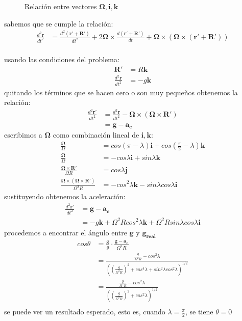 \documentclass{article}
\begin{document}
\begin{tcolorbox}
\begin{figure}[H]
        \caption{Relación entre vectores $\bm{\Omega, i, k}$}
        \label{fig:my_label}
    \end{figure}
    sabemos que se cumple la relación:
    \begin{align*}
        \frac{d^2\bm{r}}{dt^2}  
        &=\frac{d^2(\bm{r' + R'})}{dt^2}
        + 2\bm{\Omega} \times \frac{d(\bm{r' + R'})}{dt}
        + \bm{\Omega} \times (\bm{\Omega} \times (\bm{r' + R'})) \\
    \end{align*}
    \end{tcolorbox}
\begin{tcolorbox}
    usando las condiciones del problema:
    \begin{align*}
        \bm{R'} &= R\bm{k} \\
        \frac{d^2\bm{r}}{dt^2} &= -g\bm{k}
    \end{align*}
    quitando los términos que se hacen cero o son muy pequeños obtenemos la relación:
    \begin{align*}
        \frac{d^2\bm{r'}}{dt^2}
        &= \frac{d^2\bm{r}}{dt^2} - \bm{\Omega} \times (\bm{\Omega} \times \bm{R'}) \\
        &= \bm{g} - \bm{a_c}
    \end{align*} 
    escribimos a $\bm{\Omega}$ como combinación lineal de $\bm{i,k}$:
    \begin{align*}
        \frac{\bm{\Omega}}{\Omega} 
        &= cos(\pi - \lambda)\bm{i} + cos\left(\frac{\pi}{2} - \lambda \right) \bm{k} \\
        \frac{\bm{\Omega}}{\Omega} 
        &= -cos\lambda \bm{i} + sin\lambda \bm{k} \\
        \frac{\bm{\Omega} \times \bm{R'}}{\Omega R}
        &= cos\lambda \bm{j} \\
        \frac{\bm{\Omega} \times (\bm{\Omega} \times \bm{R'})}{\Omega^2 R}
        &= -cos^2\lambda \bm{k} - sin\lambda cos\lambda \bm{i} 
    \end{align*}
    sustituyendo obtenemos la aceleración:
    \begin{align*}
        \frac{d^2\bm{r'}}{dt^2} 
        &= \bm{g} - \bm{a_c} \\ 
        &= -g\bm{k} + \Omega^2R cos^2\lambda \bm{k} + \Omega^2 R sin\lambda cos\lambda \bm{i}
    \end{align*}
    procedemos a encontrar el ángulo entre $\bm{g}$ y $\bm{g_{real}}$
    \begin{align*}
        cos\theta
        &=\frac{\bm{g}}{g} \cdot \frac{\bm{g-a_c}}{\Omega^2 R} \\
        &=\frac
        {\frac{g}{\Omega^2 R} - cos^2\lambda}
        {((\frac{g}{\Omega^2 R})^2 + cos^4\lambda + sin^2\lambda cos^2\lambda)^{1/2}} \\
        &=\frac
        {\frac{g}{\Omega^2 R} - cos^2\lambda}
        {((\frac{g}{\Omega^2 R})^2 + cos^2\lambda)^{1/2}} \\ 
    \end{align*}
    se puede ver un resultado esperado, esto es, cuando $\lambda = \frac{\pi}{2}$, se tiene $\theta = 0$
\end{tcolorbox}
\end{document}
